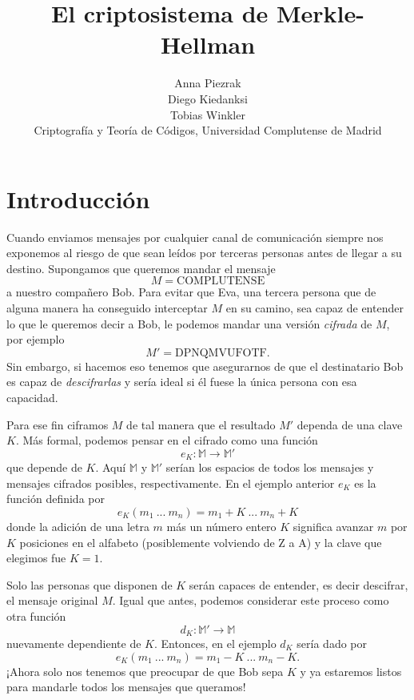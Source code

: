 \documentclass[12pt]{article}
\begin{document}
 
 
 
\title{El criptosistema de Merkle-Hellman}
\author{Anna Piezrak\\Diego Kiedanksi\\Tobias Winkler\\
Criptografía y Teoría de Códigos, Universidad Complutense de Madrid} %
 
\maketitle

\section{Introducción}

Cuando enviamos mensajes por cualquier canal de comunicación siempre nos exponemos al riesgo de que sean leídos por terceras personas antes de llegar a su destino. Supongamos que queremos mandar el mensaje
$$M = \text{COMPLUTENSE}$$
a nuestro compañero Bob. Para evitar que Eva, una tercera persona que de alguna manera ha conseguido interceptar $M$ en su camino, sea capaz de entender lo que le queremos decir a Bob, le podemos mandar una versión \emph{cifrada} de $M$, por ejemplo
$$M' = \text{DPNQMVUFOTF}.$$
Sin embargo, si hacemos eso tenemos que asegurarnos de que el destinatario Bob es capaz de \emph{descifrarlas} y sería ideal si él fuese la única persona con esa capacidad.

Para ese fin ciframos $M$ de tal manera que el resultado $M'$ dependa de una clave $K$. Más formal, podemos pensar en el cifrado como una función
$$e_K : \mathbb{M} \rightarrow \mathbb{M}'$$
que depende de $K$. Aquí $\mathbb{M}$ y $\mathbb{M}'$ serían los espacios de todos los mensajes y mensajes cifrados posibles, respectivamente. En el ejemplo anterior $e_K$ es la función definida por
$$e_K(m_1\ ...\ m_n) = m_1 + K\ ...\ m_n+K$$
donde la adición de una letra $m$ más un número entero $K$ significa avanzar $m$ por $K$ posiciones en el alfabeto (posiblemente volviendo de Z a A) y la clave que elegimos fue $K = 1$.

Solo las personas que disponen de $K$ serán capaces de entender, es decir descifrar, el mensaje original $M$. Igual que antes, podemos considerar este proceso como otra función
$$d_K : \mathbb{M}' \rightarrow \mathbb{M}$$
nuevamente dependiente de $K$. Entonces, en el ejemplo $d_K$ sería dado por
$$e_K(m_1\ ...\ m_n) = m_1 - K\ ...\ m_n - K.$$
¡Ahora solo nos tenemos que preocupar de que Bob sepa $K$ y ya estaremos listos para mandarle todos los mensajes que queramos!
\end{document}

